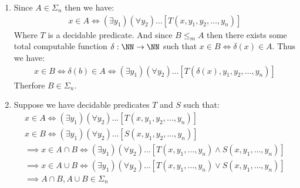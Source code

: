 \begin{enumerate}[label=\ilabel]
   \item 
      Since $A \in \Sigma_n$ then we have:
      \begin{gather*}
         x \in A \iff (\exists y_1) (\forall y_2) \dots [T(x, y_1, y_2, \dots, y_n)]
      \end{gather*}
      Where $T$ is a decidable predicate. And since $B \le_m A$ then there exists some total computable function $\delta: \NN \to \NN$ such that $x \in B \iff \delta(x) \in A$. Thus we have:
      \begin{gather*}
         x \in B \iff \delta(b) \in A \iff (\exists y_1) (\forall y_2) \dots [T(\delta(x), y_1, y_2, \dots, y_n)]
      \end{gather*}
      Therfore $B \in \Sigma_n$.

   \item 
      Suppose we have decidable predicates $T$ and $S$ such that:
      \begin{gather*}
         x \in A \iff (\exists y_1) (\forall y_2) \dots [T(x, y_1, y_2, \dots, y_n)] \\
         x \in B \iff (\exists y_1) (\forall y_2) \dots [S(x, y_1, y_2, \dots, y_n)] \\ 
         \implies x \in A \cap B \iff  (\exists y_1) (\forall y_2) \dots [T(x, y_1, \dots, y_n) \wedge S(x, y_1, \dots, y_n)] \\
         \implies x \in A \cup B \iff  (\exists y_1) (\forall y_2) \dots [T(x, y_1, \dots, y_n) \vee S(x, y_1, \dots, y_n)] \\
         \implies A \cap B , A \cup B \in \Sigma_n
      \end{gather*}
\end{enumerate}